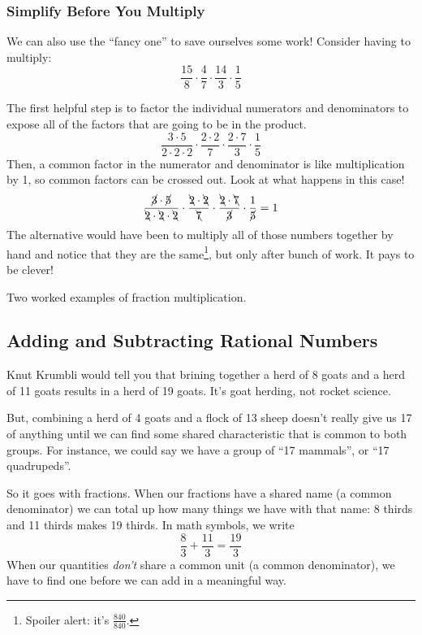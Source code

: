 \subsubsection*{Simplify Before You Multiply}

We can also use the ``fancy one'' to save ourselves some work! Consider having to multiply: \[\dfrac{15}{8}\cdot\dfrac{4}{7}\cdot\dfrac{14}{3}\cdot\dfrac{1}{5}\]

The first helpful step is to factor the individual numerators and denominators to expose all of the factors that are going to be in the product. \[\frac{3\cdot 5}{2 \cdot 2 \cdot 2} \cdot \frac{2 \cdot 2}{7} \cdot \frac{2 \cdot 7}{3} \cdot \frac{1}{5}\]
Then, a common factor in the numerator and denominator is like multiplication by 1, so common factors can be crossed out. Look at what happens in this case!
\[\frac{\cancel{3}\cdot \cancel{5}}{\bcancel{2} \cdot \bcancel{2} \cdot \bcancel{2}} \cdot \frac{\bcancel{2} \cdot \bcancel{2}}{\bcancel{7}} \cdot \frac{\bcancel{2} \cdot \bcancel{7}}{\cancel{3}} \cdot \frac{1}{\cancel{5}} = 1\]
The alternative would have been to multiply all of those numbers together by hand and notice that they are the same\footnote{Spoiler alert: it's $\frac{840}{840}$.}, but only after bunch of work. It pays to be clever!

\begin{boxedex}
Two worked examples of fraction multiplication.
\end{boxedex}

\subsection{Adding and Subtracting Rational Numbers}

Knut Krumbli would tell you that brining together a herd of 8 goats and a herd of 11 goats results in a herd of 19 goats. It's goat herding, not rocket science.

But, combining a herd of 4 goats and a flock of 13 sheep doesn't really give us 17 of anything until we can find some shared characteristic that is common to both groups. For instance, we could say we have a group of ``17 mammals'', or ``17 quadrupeds''.

So it goes with fractions. When our fractions have a shared name (a common denominator) we can total up how many things we have with that name: 8 thirds and 11 thirds makes 19 thirds. In math symbols, we write \[\frac{8}{3} + \frac{11}{3} = \frac{19}{3}\] When our quantities {\em don't} share a common unit (a common denominator), we have to find one before we can add in a meaningful way.


